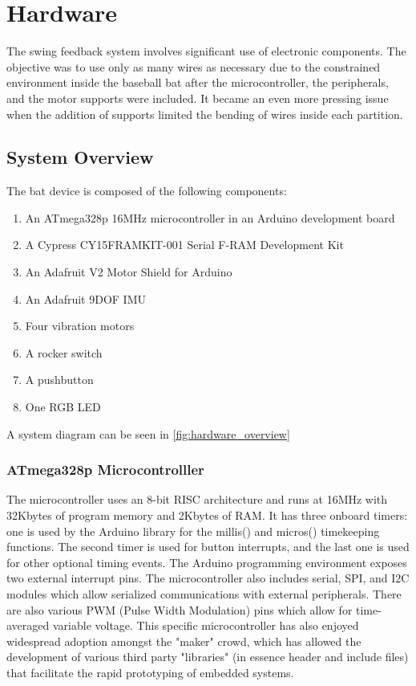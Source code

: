 \chapter{Hardware}
\label{chap:hardware}

The swing feedback system involves significant use of electronic components.  The objective was to use only as many wires as necessary due to the constrained environment inside the baseball bat after the microcontroller, the peripherals, and the motor supports were included.  It became an even more pressing issue when the addition of supports limited the bending of wires inside each partition.

\section{System Overview}

The bat device is composed of the following components:

\begin{enumerate}
\item An ATmega328p 16MHz microcontroller in an Arduino development board
\item A Cypress CY15FRAMKIT-001 Serial F-RAM Development Kit
\item An Adafruit V2 Motor Shield for Arduino
\item An Adafruit 9DOF IMU
\item Four vibration motors
\item A rocker switch
\item A pushbutton
\item One RGB LED
\end{enumerate}

A system diagram can be seen in \autoref{fig:hardware_overview}

\subsection{ATmega328p Microcontrolller}

The microcontroller uses an 8-bit RISC architecture and runs at 16MHz with 32Kbytes of program memory and 2Kbytes of RAM.  It has three onboard timers: one is used by the Arduino library for the millis() and micros() timekeeping functions.  The second timer is used for button interrupts, and the last one is used for other optional timing events.  The Arduino programming environment exposes two external interrupt pins.  The microcontroller also includes serial, SPI, and I2C modules which allow serialized communications with external peripherals.  There are also various PWM (Pulse Width Modulation) pins which allow for time-averaged variable voltage.  This specific microcontroller has also enjoyed widespread adoption amongst the "maker" crowd, which has allowed the development of various third party "libraries" (in essence header and include files) that facilitate the rapid prototyping of embedded systems.

